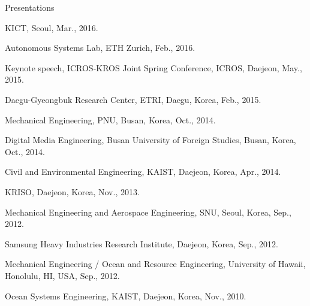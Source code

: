 \begin{rSection}{Presentations}
\begin{pubSubsectionNum}{}
  \item \ac{KICT}, Seoul, Mar., 2016.

  \item Autonomous Systems Lab, ETH Zurich, Feb., 2016.

  \item Keynote speech, ICROS-KROS Joint Spring Conference, \ac{ICROS}, Daejeon, May., 2015.

  \item Daegu-Gyeongbuk Research Center, \ac{ETRI}, Daegu, Korea, Feb., 2015.
  \item Mechanical Engineering, \ac{PNU}, Busan, Korea, Oct., 2014.
  \item Digital Media Engineering, Busan University of Foreign Studies, Busan, Korea, Oct., 2014.
  \item Civil and Environmental Engineering, \ac{KAIST}, Daejeon, Korea, Apr., 2014.
  \item \ac{KRISO}, Daejeon, Korea, Nov., 2013.
  \item Mechanical Engineering and Aerospace Engineering, \ac{SNU}, Seoul, Korea, Sep., 2012.
  \item Samsung Heavy Industries Research Institute, Daejeon, Korea, Sep., 2012.
  \item Mechanical Engineering / Ocean and Resource Engineering, University of Hawaii, Honolulu, HI, USA, Sep., 2012.
  \item Ocean Systems Engineering, \ac{KAIST}, Daejeon, Korea, Nov., 2010.
\end{pubSubsectionNum}

\end{rSection}
